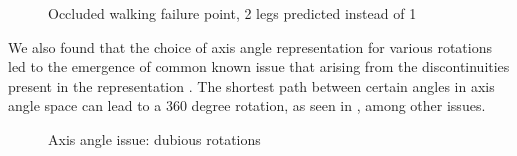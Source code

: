 \begin{figure}[h!]
    \centering
    \hfil
    \hfil
    \caption{Occluded walking failure point, 2 legs predicted instead of 1}
    \label{fig:humor_bad_occluded_walking}
\end{figure}

We also found that the choice of axis angle representation for various rotations led to the emergence of common known issue that arising from the discontinuities present in the representation \cite{aa_6d_angles}. The shortest path between certain angles in axis angle space can lead to a 360 degree rotation, as seen in , among other issues.

\begin{figure}[h!]
    \centering
    \hfil
    \hfil
    \caption{Axis angle issue: dubious rotations}
    \label{fig:humor_bad_aa}
\end{figure}

